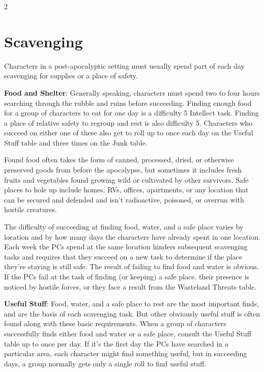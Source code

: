 \begin{multicols}{2}

\chapter{Scavenging}
Characters in a post-apocalyptic setting must usually spend part of each day scavenging for supplies or a place of safety.

\textbf{Food and Shelter}: Generally speaking, characters must spend two to four hours searching through the rubble and ruins before succeeding. Finding enough food for a group of characters to eat for one day is a difficulty 5 Intellect task. Finding a place of relative safety to regroup and rest is also difficulty 5. Characters who succeed on either one of these also get to roll up to once each day on the Useful Stuff table and three times on the Junk table. 

Found food often takes the form of canned, processed, dried, or otherwise preserved goods from before the apocalypse, but sometimes it includes fresh fruits and vegetables found growing wild or cultivated by other survivors. Safe places to hole up include homes, RVs, offices, apartments, or any location that can be secured and defended and isn’t radioactive, poisoned, or overrun with hostile creatures.

The difficulty of succeeding at finding food, water, and a safe place varies by location and by how many days the characters have already spent in one location. Each week the PCs spend at the same location hinders subsequent scavenging tasks and requires that they succeed on a new task to determine if the place they’re staying is still safe. The result of failing to find food and water is obvious. If the PCs fail at the task of finding (or keeping) a safe place, their presence is noticed by hostile forces, or they face a result from the Wasteland Threats table.

\textbf{Useful Stuff}: Food, water, and a safe place to rest are the most important finds, and are the basis of each scavenging task. But other obviously useful stuff is often found along with these basic requirements. When a group of characters successfully finds either food and water or a safe place, consult the Useful Stuff table up to once per day. If it’s the first day the PCs have searched in a particular area, each character might find something useful, but in succeeding days, a group normally gets only a single roll to find useful stuff.


\end{multicols}
